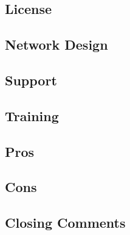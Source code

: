 \subsection{License}
\subsection{Network Design}
\subsection{Support}
\subsection{Training}
\subsection{Pros}
\subsection{Cons}
\subsection{Closing Comments}